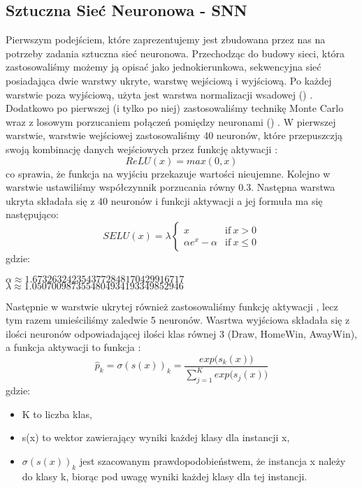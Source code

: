         \subsection{Sztuczna Sieć Neuronowa - SNN}
        Pierwszym podejściem, które zaprezentujemy jest zbudowana przez nas na potrzeby zadania sztuczna sieć neuronowa. Przechodząc do budowy sieci, która zastosowaliśmy możemy ją opisać jako jednokierunkowa, sekwencyjna sieć posiadająca dwie warstwy ukryte, warstwę wejściową i wyjściową. Po każdej warstwie poza wyjściową, użyta jest warstwa normalizacji wsadowej () \cite{BatchNormalization}. Dodatkowo po pierwszej (i tylko po niej) zastosowaliśmy technikę Monte Carlo wraz z losowym porzucaniem połączeń pomiędzy neuronami () \cite{MCDropout} \cite{Dropout} \cite{Dropout2}. W pierwszej warstwie, warstwie wejściowej zastosowaliśmy 40 neuronów, które przepuszczją swoją kombinację danych wejściowych przez funkcję aktywacji : \[ReLU(x) = max(0, x)\] co sprawia, że funkcja na wyjściu przekazuje wartości nieujemne. Kolejno w warstwie  ustawiliśmy współczynnik porzucania równy 0.3. Następna warstwa ukryta składała się z 40 neuronów i funkcji aktywacji  \cite{SELU} a jej formuła ma się następująco:
        \[
        SELU(x) = \lambda
        \begin{cases}
            x &  \text{if}\ x > 0\\
            \alpha e^{x} - \alpha &  \text{if}\ x \le 0
        \end{cases}
        \]
        gdzie:
        \begin{center}
            $\alpha \approx 1.6732632423543772848170429916717$ \\ 
            $\lambda \approx 1.0507009873554804934193349852946$
        \end{center}
        Następnie w warstwie ukrytej również zastosowaliśmy funkcję aktywacji , lecz tym razem umieściliśmy zaledwie 5 neuronów. Wasrtwa wyjściowa składała się z ilości neuronów odpowiadającej ilości klas równej 3 (Draw, HomeWin, AwayWin), a funkcja aktywacji to funkcja :
        \[
        \hat{p}_{k} = \sigma(s(x))_{k} = \frac{exp \big(s_{k}(x)\big)}{\sum_{j=1}^{K}exp \big(s_{j}(x)\big)}
        \]
        gdzie:
        \begin{itemize}
            \item K to liczba klas,
            \item s(x) to wektor zawierający wyniki każdej klasy dla instancji x,
            \item $\sigma(s(x))_{k}$ jest szacowanym prawdopodobieństwem, że instancja x należy do klasy k, biorąc pod uwagę wyniki każdej klasy dla tej instancji.
        \end{itemize}
